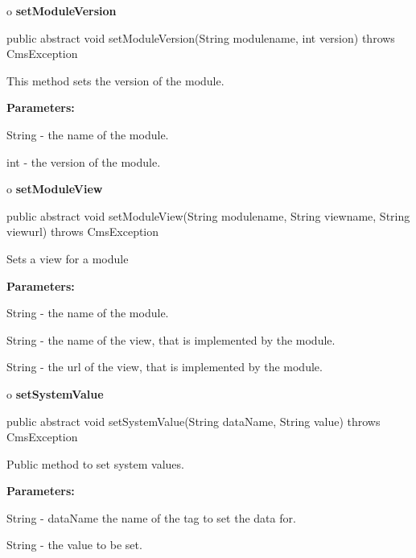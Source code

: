 o {\bf setModuleVersion} 

\begin{PRE}
 public abstract void setModuleVersion(String modulename,
                                       int version) throws CmsException
\end{PRE}

\begin{description}
\htmlDD This method sets the version of the module. 

\begin{description}
\item {\bf Parameters:}  

String - the name of the module.  

int - the version of the module.  
\end{description}

\end{description}

o {\bf setModuleView} 

\begin{PRE}
 public abstract void setModuleView(String modulename,
                                    String viewname,
                                    String viewurl) throws CmsException
\end{PRE}

\begin{description}
\htmlDD Sets a view for a module 

\begin{description}
\item {\bf Parameters:}  

String - the name of the module.  

String - the name of the view, that is implemented by the module.  

String - the url of the view, that is implemented by the module.  
\end{description}

\end{description}

o {\bf setSystemValue} 

\begin{PRE}
 public abstract void setSystemValue(String dataName,
                                     String value) throws CmsException
\end{PRE}

\begin{description}
\htmlDD Public method to set system values. 

\begin{description}
\item {\bf Parameters:}  

String - dataName the name of the tag to set the data for.  

String - the value to be set.  
\end{description}

\end{description}


